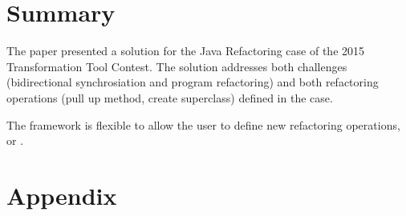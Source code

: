 \documentclass[submission,copyright,creativecommons]{eptcs}
\begin{document}

\section{Summary}

The paper presented a solution for the Java Refactoring case of the 2015 Transformation Tool Contest. The solution addresses both challenges (bidirectional synchrosiation and program refactoring) and both refactoring operations (pull up method, create superclass) defined in the case.

The framework is flexible to allow the user to define new refactoring operations, \eg {} or .




\clearpage

\appendix
\section{Appendix}


\end{document}
